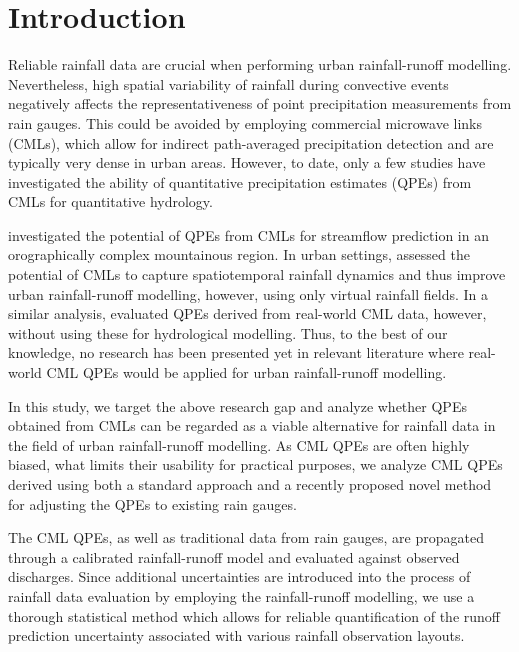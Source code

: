\documentclass{ctuthesis}\usepackage[]{graphicx}\usepackage[]{color}
\begin{document}
\section{Introduction}

Reliable rainfall data are crucial when performing urban rainfall-runoff modelling. Nevertheless, high spatial variability of rainfall during convective events negatively affects the representativeness of point precipitation measurements from rain gauges. This could be avoided by employing commercial microwave links (CMLs), which allow for indirect path-averaged precipitation detection and are typically very dense in urban areas. However, to date, only a few studies have investigated the ability of quantitative precipitation estimates (QPEs) from CMLs for quantitative hydrology. 

\cite{smiatekPotentialCommercialMicrowave2017} investigated the potential of QPEs from CMLs for streamflow prediction in an orographically complex mountainous region. In urban settings,  \cite{fencl2013assessing} assessed the potential of CMLs to capture spatiotemporal rainfall dynamics and thus improve urban rainfall-runoff modelling, however, using only  virtual rainfall fields. In a similar analysis, \cite{fenclCommercialMicrowaveLinks2015} evaluated QPEs derived from real-world CML data, however, without using these for hydrological modelling. Thus, to the best of our knowledge, no research has been presented yet in relevant literature where real-world CML QPEs would be applied for urban rainfall-runoff modelling. 

In this study, we target the above research gap and analyze whether QPEs obtained from CMLs can be regarded as a viable alternative for rainfall data in the field of urban rainfall-runoff modelling. As CML QPEs are often highly biased, what limits their usability for practical purposes, we analyze CML QPEs derived using both a standard approach and a recently proposed \citep{fenclGaugeadjustedRainfallEstimates2017} novel method for adjusting the QPEs to existing rain gauges. 

The CML QPEs, as well as traditional data from rain gauges, are propagated through a calibrated rainfall-runoff model and evaluated against observed discharges. Since additional uncertainties are introduced into the process of rainfall data evaluation by employing the rainfall-runoff modelling, we use a thorough statistical method which allows for reliable quantification of the runoff prediction uncertainty associated with various rainfall observation layouts. 
\end{document}
